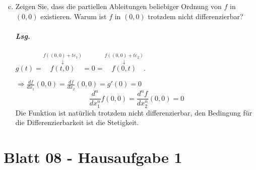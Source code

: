 \documentclass{scrreprt}
\begin{document}
\begin{enumerate}[a)]
\setcounter{enumi}{2}
\item Zeigen Sie, dass die partiellen Ableitungen beliebiger Ordnung von
  $f$ in $(0, 0)$ existieren.
  Warum ist $f$ in $(0, 0)$ trotzdem nicht differenzierbar?

  \subparagraph{Lsg.}
  $g(t) = \overset{f((0,0) + te_1)}{\overset{\downarrow}{f(t, 0)}} = 0 =
  \overset{f((0,0) + te_2)}{\overset{\downarrow}{f(0, t)}}$.

  $\Rightarrow \frac{df}{dx_1}(0, 0) = \frac{df}{dx_2} (0,0) = g'(0) = 0$
  {
    \color{red!60!black}
    \[
      \frac{d^n}{dx_1^n}f(0, 0) = \frac{d^nf}{dx_2^n} (0, 0) = 0
    \]
  }
  Die Funktion ist natürlich trotzdem nicht differenzierbar, den Bedingung für
  die Differenzierbarkeit ist die Stetigkeit.
\end{enumerate}

\section{Blatt 08 - Hausaufgabe 1}
\end{document}
